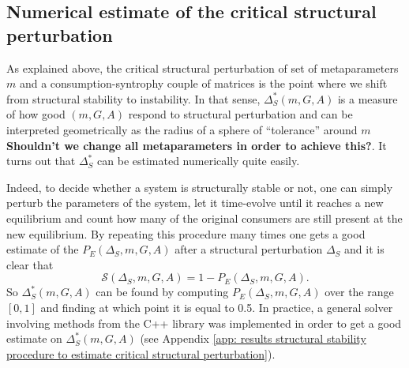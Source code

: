 \documentclass[12pt, titlepage]{report}
\begin{document}
\subsection{Numerical estimate of the critical structural perturbation}\label{sec : structural stability methods numerical estimate critical perturbation}
As explained above, the critical structural perturbation of set of metaparameters $m$ and a consumption-syntrophy couple of matrices is the point where we shift from structural stability to instability. In that sense, $\Delta_S^*(m, G, A)$ is a measure of how good $(m, G, A)$ respond to structural perturbation and can be interpreted geometrically as the radius of a sphere of ``tolerance'' around $m$ \textbf{Shouldn't we change all metaparameters in order to achieve this?}. It turns out that $\Delta_S^*$ can be estimated numerically quite easily.

Indeed, to decide whether a system is structurally stable or not, one can simply perturb the parameters of the system, let it time-evolve until it reaches a new equilibrium and count how many of the original consumers are still present at the new equilibrium. By repeating this procedure many times one gets a good estimate of the  $P_E(\Delta_S, m, G, A)$
after a structural perturbation $\Delta_S$ and it is clear that
\begin{equation}
\mathcal{S}(\Delta_S, m, G, A)=1-P_E(\Delta_S, m, G, A).
\end{equation}
So $\Delta_S^*(m, G, A)$ can be found by computing $P_E(\Delta_S, m, G, A)$ over the range $[0,1]$ and finding at which point it is equal to 0.5. In practice, a general solver involving methods from the C++  library was implemented in order to get a good estimate on $\Delta_S^*(m, G, A)$ (see Appendix \ref{app: results structural stability procedure to estimate critical structural perturbation}).

\end{document}
